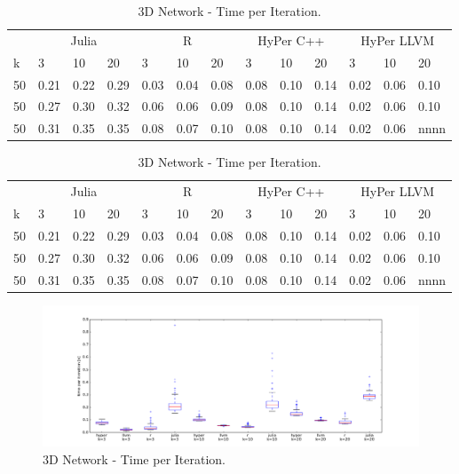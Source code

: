\begin{table}[htsb]
  \caption[3D Network - Time per Iteration]{3D Network - Time per Iteration.}
  \label{tab:network_all}
  \centering
  \begin{tabular}{l l l l l l l l l l l l l}
    \toprule
      & \multicolumn{3}{c}{Julia} & \multicolumn{3}{c}{R} & \multicolumn{3}{c}{HyPer C++} & \multicolumn{3}{c}{HyPer LLVM}  \\
      k & 3 & 10 & 20 & 3 & 10 & 20 & 3 & 10 & 20 & 3 & 10 & 20 \\
    \midrule
      50  & 0.21 & 0.22 & 0.29 & 0.03 & 0.04 & 0.08 & 0.08 & 0.10 & 0.14 & 0.02 & 0.06 & 0.10 \\
      50  & 0.27 & 0.30 & 0.32 & 0.06 & 0.06 & 0.09 & 0.08 & 0.10 & 0.14 & 0.02 & 0.06 & 0.10 \\
      50  & 0.31 & 0.35 & 0.35 & 0.08 & 0.07 & 0.10 & 0.08 & 0.10 & 0.14 & 0.02 & 0.06 & nnnn \\
    \bottomrule
  \end{tabular}
\end{table}

\begin{table}[htsb]
  \caption[3D Network - Time per Iteration]{3D Network - Time per Iteration.}
  \label{tab:network_all}
  \centering
  \begin{tabular}{l l l l l l l l l l l l l}
    \toprule
      & \multicolumn{3}{c}{Julia} & \multicolumn{3}{c}{R} & \multicolumn{3}{c}{HyPer C++} & \multicolumn{3}{c}{HyPer LLVM}  \\
      k & 3 & 10 & 20 & 3 & 10 & 20 & 3 & 10 & 20 & 3 & 10 & 20 \\
    \midrule
      50  & 0.21 & 0.22 & 0.29 & 0.03 & 0.04 & 0.08 & 0.08 & 0.10 & 0.14 & 0.02 & 0.06 & 0.10 \\
      50  & 0.27 & 0.30 & 0.32 & 0.06 & 0.06 & 0.09 & 0.08 & 0.10 & 0.14 & 0.02 & 0.06 & 0.10 \\
      50  & 0.31 & 0.35 & 0.35 & 0.08 & 0.07 & 0.10 & 0.08 & 0.10 & 0.14 & 0.02 & 0.06 & nnnn \\
    \bottomrule
  \end{tabular}
\end{table}



\begin{figure}[htsb]
  \raggedleft
  \includegraphics[scale=0.4, trim="0cm 1cm 0cm 0cm"]{figures/charts/network_all}
  \caption[3D Network - Time per Iteration]{3D Network - Time per Iteration.}
  \label{fig:network_all}
\end{figure}


